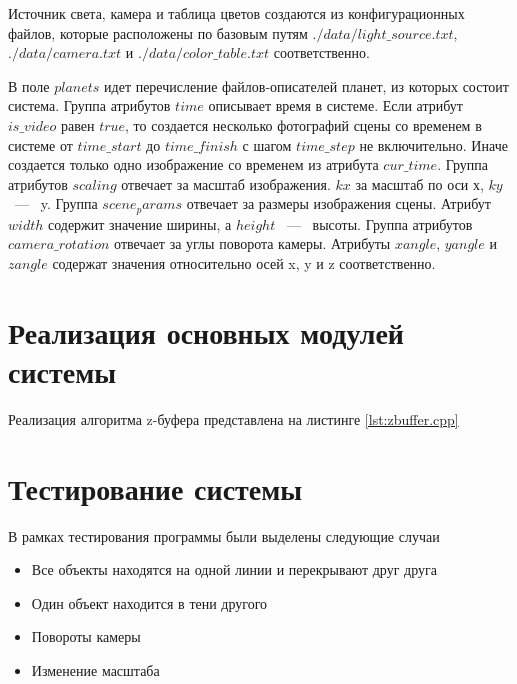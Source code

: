 
Источник света, камера и таблица цветов создаются из конфигурационных файлов, которые расположены по базовым путям $./data/light\_source.txt$, $./data/camera.txt$ и $./data/color\_table.txt$ соответственно.

В поле $planets$ идет перечисление файлов-описателей планет, из которых состоит система. Группа атрибутов $time$ описывает время в системе. Если атрибут $is\_video$ равен $true$, то создается несколько  фотографий сцены со временем в системе от $time\_start$ до $time\_finish$ с шагом  $time\_step$ не включительно. Иначе создается только одно изображение со временем из атрибута $cur\_time$. Группа атрибутов $scaling$ отвечает за масштаб изображения. $kx$ за масштаб по оси х, $ky$ ~---~ y. Группа $scene_params$ отвечает за размеры изображения сцены. Атрибут $width$ содержит значение ширины, а $height$ ~---~ высоты. Группа атрибутов $camera\_rotation$ отвечает за углы поворота камеры. Атрибуты $xangle$, $yangle$ и $zangle$ содержат значения относительно осей x, y и z соответственно.

\section{Реализация основных модулей системы}

Реализация алгоритма z-буфера представлена на листинге \ref{lst:zbuffer.cpp}


\section{Тестирование системы}
В рамках тестирования программы были выделены следующие случаи
\begin{itemize}
	\item Все объекты находятся на одной линии и перекрывают друг друга
	\item Один объект находится в тени другого
	\item Повороты камеры
	\item Изменение масштаба
\end{itemize}

